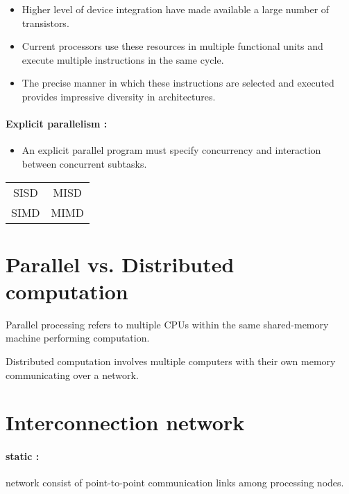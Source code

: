 \documentclass[11pt,a4paper]{report}
\begin{document}
\begin{itemize}
    \item Higher level of device integration have made available a large number of transistors.
    \item Current processors use these resources in multiple functional units and execute multiple instructions in the same cycle.
    \item The precise manner in which these instructions are selected and executed provides impressive diversity in architectures.
\end{itemize}

\paragraph*{Explicit parallelism : }

\begin{itemize}
    \item An explicit parallel program must specify concurrency and interaction between concurrent subtasks.
\end{itemize}

\begin{tabular}{cc}
    SISD & MISD \\
    SIMD & MIMD
\end{tabular}


\section{Parallel vs. Distributed computation} %
\label{sec:Parallel vs. Distributed computation}

Parallel processing refers to multiple CPUs within the same shared-memory machine performing computation.

Distributed computation involves multiple computers with their own memory communicating over a network.


\section{Interconnection network} %
\label{sec:Interconnection network}

\paragraph*{static :} network consist of point-to-point communication links among processing nodes.
\end{document}

